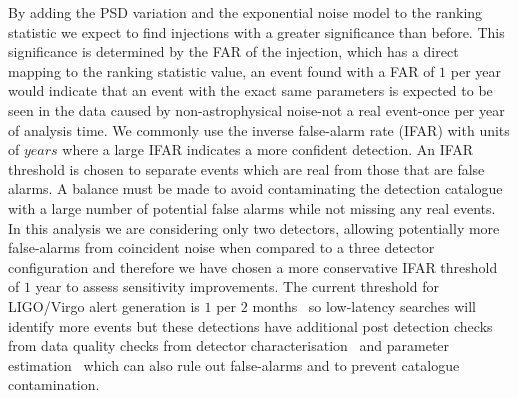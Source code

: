 By adding the PSD variation and the exponential noise model to the ranking statistic we expect to find \gwadj injections with a greater significance than before. This significance is determined by the FAR of the injection, which has a direct mapping to the ranking statistic value, an event found with a FAR of $1$ per year would indicate that an event with the exact same parameters is expected to be seen in the data caused by non-astrophysical noise-not a real event-once per year of analysis time. We commonly use the inverse false-alarm rate (IFAR) with units of $years$ where a large IFAR indicates a more confident detection. An IFAR threshold is chosen to separate events which are real from those that are false alarms. A balance must be made to avoid contaminating the detection catalogue with a large number of potential false alarms while not missing any real events. In this analysis we are considering only two detectors, allowing potentially more false-alarms from coincident noise when compared to a three detector configuration and therefore we have chosen a more conservative IFAR threshold of $1$ year to assess sensitivity improvements. The current threshold for LIGO/Virgo alert generation is $1$ per $2$ months~\cite{PyCBC_Live:2018} so low-latency \gwadj searches will identify more \gwadj events but these detections have additional post detection checks from data quality checks from detector characterisation~\cite{O2O3_DetChar:2021} and parameter estimation~\cite{gwtc3:2023} which can also rule out false-alarms and to prevent catalogue contamination.


